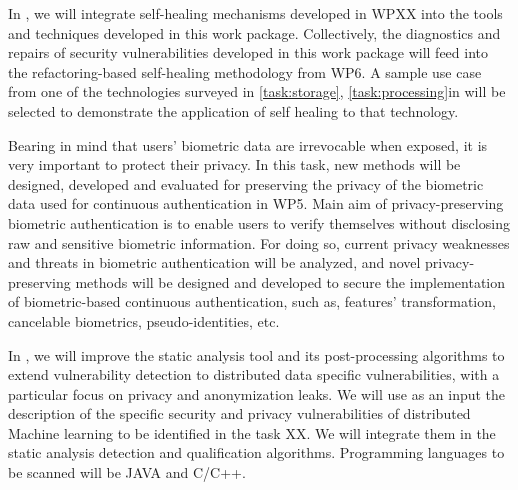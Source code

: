 \begin{Workpackage}{\thewpno}
\begin{Task}
  \TaskResults{%
  }
  \TaskHeader{}
  In \theTask, we will integrate self-healing mechanisms developed in WPXX into the tools and techniques developed in this work package. Collectively, the diagnostics and repairs of security vulnerabilities developed in this work package will feed into the refactoring-based self-healing methodology from WP6. A sample use case from one of the technologies surveyed in \ref{task:storage}, \ref{task:processing}in  will be selected to demonstrate the application of self healing to that technology. 
 \end{Task}
 
 
 \begin{Task}
  
  \TaskResults{%
  }
  \TaskHeader{}
  Bearing in mind that users' biometric data are irrevocable when exposed, it is very important to protect their privacy. In this task, new methods will be designed, developed and evaluated for preserving the privacy of the biometric data used for continuous authentication in WP5. Main aim of privacy-preserving biometric authentication is to enable users to verify themselves without disclosing raw and sensitive biometric information. For doing so, current privacy weaknesses and threats in biometric authentication will be analyzed, and novel privacy-preserving methods will be designed and developed to secure the implementation of biometric-based continuous authentication, such as, features' transformation, cancelable biometrics, pseudo-identities, etc.
 \end{Task}
 
 
\begin{Task}

\TaskResults{%
}
\TaskHeader{}
In \theTask, we will improve the static analysis tool and its post-processing algorithms to extend vulnerability detection to distributed data specific vulnerabilities, with a particular focus on privacy and anonymization leaks. We will use as an input the description of the specific security and privacy vulnerabilities of distributed Machine learning to be identified in the task XX. We will integrate them in the static analysis detection and qualification algorithms. Programming languages to be scanned will be JAVA and C/C++.


\end{Task}
\end{Workpackage}
